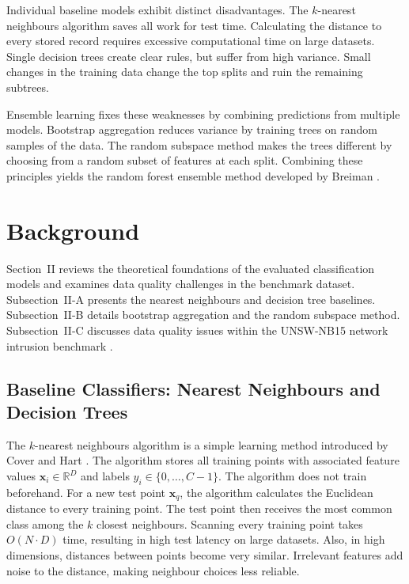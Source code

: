 \documentclass[conference,10pt]{IEEEtran}
\begin{document}
Individual baseline models exhibit distinct disadvantages. The $k$-nearest neighbours algorithm saves all work for test time. Calculating the distance to every stored record requires excessive computational time on large datasets. Single decision trees create clear rules, but suffer from high variance. Small changes in the training data change the top splits and ruin the remaining subtrees.

Ensemble learning fixes these weaknesses by combining predictions from multiple models. Bootstrap aggregation reduces variance by training trees on random samples of the data. The random subspace method makes the trees different by choosing from a random subset of features at each split. Combining these principles yields the random forest ensemble method developed by Breiman \cite{breiman2001}.

\section{Background}

Section~II reviews the theoretical foundations of the evaluated classification models and examines data quality challenges in the benchmark dataset. Subsection~II-A presents the nearest neighbours and decision tree baselines. Subsection~II-B details bootstrap aggregation and the random subspace method. Subsection~II-C discusses data quality issues within the UNSW-NB15 network intrusion benchmark \cite{moustafa2015}.

\subsection{Baseline Classifiers: Nearest Neighbours and Decision Trees}

The $k$-nearest neighbours algorithm is a simple learning method introduced by Cover and Hart \cite{cover1967}. The algorithm stores all training points with associated feature values $\mathbf{x}_i \in \mathbb{R}^D$ and labels $y_i \in \{0, \dots, C-1\}$. The algorithm does not train beforehand. For a new test point $\mathbf{x}_q$, the algorithm calculates the Euclidean distance to every training point. The test point then receives the most common class among the $k$ closest neighbours. Scanning every training point takes $O(N \cdot D)$ time, resulting in high test latency on large datasets. Also, in high dimensions, distances between points become very similar. Irrelevant features add noise to the distance, making neighbour choices less reliable.
\end{document}
